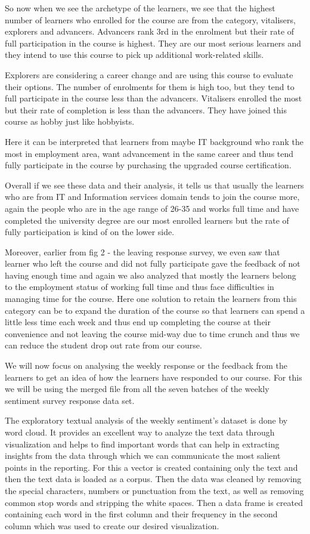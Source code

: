 \documentclass[
]{article}
\begin{document}
So now when we see the archetype of the learners, we see that the
highest number of learners who enrolled for the course are from the
category, vitalisers, explorers and advancers. Advancers rank 3rd in the
enrolment but their rate of full participation in the course is highest.
They are our most serious learners and they intend to use this course to
pick up additional work-related skills.

Explorers are considering a career change and are using this course to
evaluate their options. The number of enrolments for them is high too,
but they tend to full participate in the course less than the advancers.
Vitalisers enrolled the most but their rate of completion is less than
the advancers. They have joined this course as hobby just like
hobbyists.

Here it can be interpreted that learners from maybe IT background who
rank the most in employment area, want advancement in the same career
and thus tend fully participate in the course by purchasing the upgraded
course certification.

Overall if we see these data and their analysis, it tells us that
usually the learners who are from IT and Information services domain
tends to join the course more, again the people who are in the age range
of 26-35 and works full time and have completed the university degree
are our most enrolled learners but the rate of fully participation is
kind of on the lower side.

Moreover, earlier from fig 2 - the leaving response survey, we even saw
that learner who left the course and did not fully participate gave the
feedback of not having enough time and again we also analyzed that
mostly the learners belong to the employment status of working full time
and thus face difficulties in managing time for the course. Here one
solution to retain the learners from this category can be to expand the
duration of the course so that learners can spend a little less time
each week and thus end up completing the course at their convenience and
not leaving the course mid-way due to time crunch and thus we can reduce
the student drop out rate from our course.

We will now focus on analysing the weekly response or the feedback from
the learners to get an idea of how the learners have responded to our
course. For this we will be using the merged file from all the seven
batches of the weekly sentiment survey response data set.

The exploratory textual analysis of the weekly sentiment's dataset is
done by word cloud. It provides an excellent way to analyze the text
data through visualization and helps to find important words that can
help in extracting insights from the data through which we can
communicate the most salient points in the reporting. For this a vector
is created containing only the text and then the text data is loaded as
a corpus. Then the data was cleaned by removing the special characters,
numbers or punctuation from the text, as well as removing common stop
words and stripping the white spaces. Then a data frame is created
containing each word in the first column and their frequency in the
second column which was used to create our desired visualization.
\end{document}
